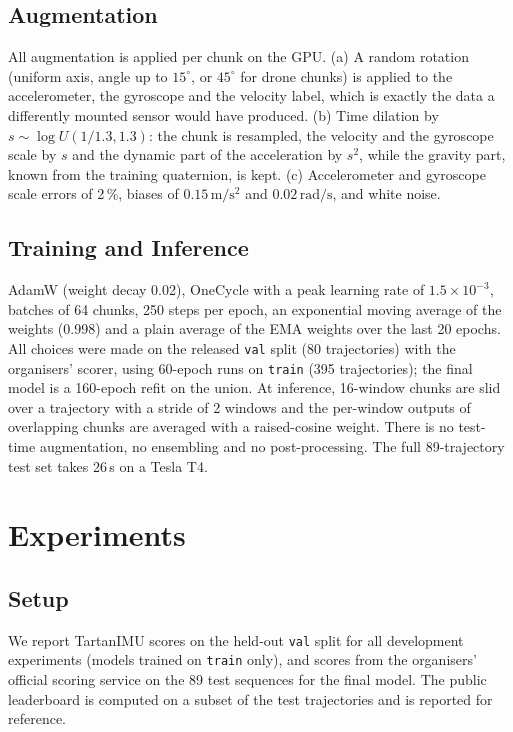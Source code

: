 \documentclass[letterpaper,10pt,conference]{ieeeconf}
\begin{document}
\subsection{Augmentation}
All augmentation is applied per chunk on the GPU. (a) A random rotation (uniform axis, angle up to $15^\circ$, or
$45^\circ$ for drone chunks) is applied to the accelerometer, the gyroscope and the velocity label, which is exactly
the data a differently mounted sensor would have produced. (b) Time dilation by $s \sim \log U(1/1.3, 1.3)$: the
chunk is resampled, the velocity and the gyroscope scale by $s$ and the dynamic part of the acceleration by $s^2$,
while the gravity part, known from the training quaternion, is kept. (c) Accelerometer and gyroscope scale errors of
2\,\%, biases of $0.15\,\mathrm{m/s^2}$ and $0.02\,\mathrm{rad/s}$, and white noise.

\subsection{Training and Inference}
AdamW (weight decay 0.02), OneCycle with a peak learning rate of $1.5 \times 10^{-3}$, batches of 64 chunks, 250
steps per epoch, an exponential moving average of the weights (0.998) and a plain average of the EMA weights over the
last 20 epochs. All choices were made on the released \texttt{val} split (80 trajectories) with the organisers'
scorer, using 60-epoch runs on \texttt{train} (395 trajectories); the final model is a 160-epoch refit on the union.
At inference, 16-window chunks are slid over a trajectory with a stride of 2 windows and the per-window outputs of
overlapping chunks are averaged with a raised-cosine weight. There is no test-time augmentation, no ensembling and
no post-processing. The full 89-trajectory test set takes 26\,s on a Tesla T4.

\section{Experiments}
\subsection{Setup}
We report TartanIMU scores on the held-out \texttt{val} split for all development experiments (models trained on
\texttt{train} only), and scores from the organisers' official scoring service on the 89 test sequences for the
final model. The public leaderboard is computed on a subset of the test trajectories and is reported for reference.
\end{document}
